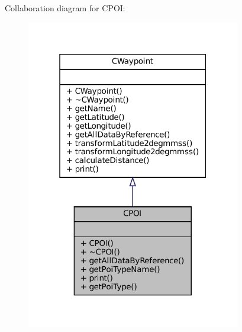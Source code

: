Collaboration diagram for C\+P\+OI\+:
\nopagebreak
\begin{figure}[H]
\begin{center}
\leavevmode
\includegraphics[width=265pt]{classCPOI__coll__graph}
\end{center}
\end{figure}
